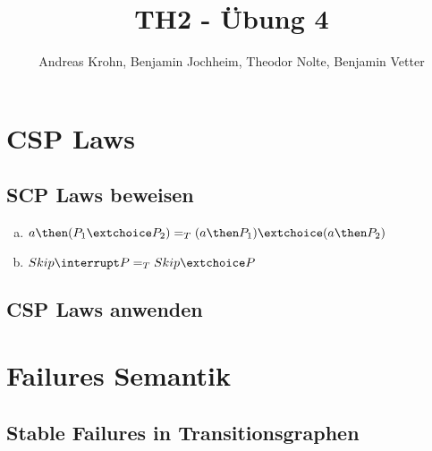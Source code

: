 \documentclass{scrreprt}
\begin{document}
\author{Andreas Krohn, Benjamin Jochheim, Theodor Nolte, Benjamin Vetter}
\title{TH2 - Übung 4}

\maketitle

\chapter{CSP Laws}

\section{SCP Laws beweisen}

\begin{enumerate}[a)]

\item $ a \then (P_1 \extchoice P_2) =_T (a \then P_1) \extchoice (a \then P_2) $

\item $ Skip \interrupt P =_T Skip \extchoice P $

\end{enumerate}

\section{CSP Laws anwenden}

\chapter{Failures Semantik}

\section{Stable Failures in Transitionsgraphen}
\end{document}
